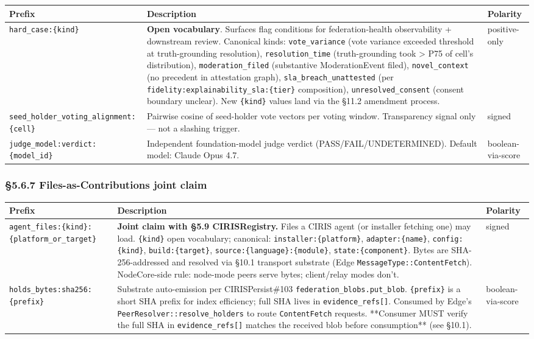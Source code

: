 \documentclass[10pt]{article}
\begin{document}
{\footnotesize
\begin{longtable}{|p{5.33cm}|p{5.33cm}|p{5.33cm}|}\hline
\textbf{Prefix} & \textbf{Description} & \textbf{Polarity} \\ \hline\endhead
\texttt{hard\_case:\{kind\}} & \textbf{Open vocabulary}. Surfaces flag conditions for federation-health observability + downstream review. Canonical kinds: \texttt{vote\_variance} (vote variance exceeded threshold at truth-grounding resolution), \texttt{resolution\_time} (truth-grounding took > P75 of cell's distribution), \texttt{moderation\_filed} (substantive ModerationEvent filed), \texttt{novel\_context} (no precedent in attestation graph), \texttt{sla\_breach\_unattested} (per \texttt{fidelity:explainability\_sla:\{tier\}} composition), \texttt{unresolved\_consent} (consent boundary unclear). New \texttt{\{kind\}} values land via the §11.2 amendment process. & positive-only \\ \hline
\texttt{seed\_holder\_voting\_alignment:\{cell\}} & Pairwise cosine of seed-holder vote vectors per voting window. Transparency signal only — not a slashing trigger. & signed \\ \hline
\texttt{judge\_model:verdict:\{model\_id\}} & Independent foundation-model judge verdict (PASS/FAIL/UNDETERMINED). Default model: Claude Opus 4.7. & boolean-via-score \\ \hline
\end{longtable}}


\subsubsection*{§5.6.7 Files-as-Contributions joint claim}


{\footnotesize
\begin{longtable}{|p{5.33cm}|p{5.33cm}|p{5.33cm}|}\hline
\textbf{Prefix} & \textbf{Description} & \textbf{Polarity} \\ \hline\endhead
\texttt{agent\_files:\{kind\}:\{platform\_or\_target\}} & \textbf{Joint claim with §5.9 CIRISRegistry.} Files a CIRIS agent (or installer fetching one) may load. \texttt{\{kind\}} open vocabulary; canonical: \texttt{installer:\{platform\}}, \texttt{adapter:\{name\}}, \texttt{config:\{kind\}}, \texttt{build:\{target\}}, \texttt{source:\{language\}:\{module\}}, \texttt{state:\{component\}}. Bytes are SHA-256-addressed and resolved via §10.1 transport substrate (Edge \texttt{MessageType::ContentFetch}). NodeCore-side rule: node-mode peers serve bytes; client/relay modes don't. & signed \\ \hline
\texttt{holds\_bytes:sha256:\{prefix\}} & Substrate auto-emission per CIRISPersist\#103 \texttt{federation\_blobs.put\_blob}. \texttt{\{prefix\}} is a short SHA prefix for index efficiency; full SHA lives in \texttt{evidence\_refs[]}. Consumed by Edge's \texttt{PeerResolver::resolve\_holders} to route \texttt{ContentFetch} requests. **Consumer MUST verify the full SHA in \texttt{evidence\_refs[]} matches the received blob before consumption** (see §10.1). & boolean-via-score \\ \hline
\end{longtable}}
\end{document}

